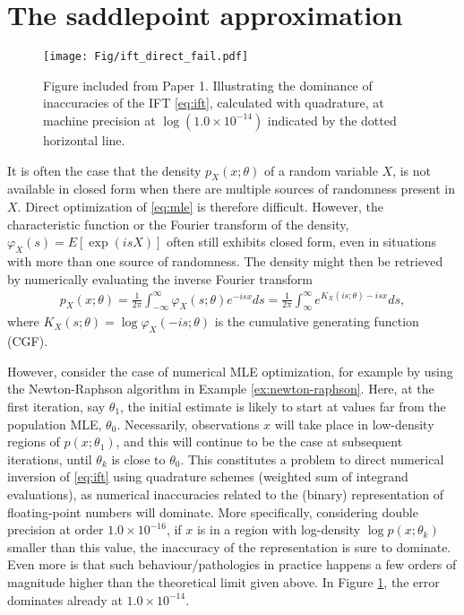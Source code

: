 

\section{The saddlepoint approximation}
\begin{figure}[t!]
	\centering
	\texttt{[image: Fig/ift\_direct\_fail.pdf]}
	\caption{
	\label{fig:ift-direct-fail}
	Figure included from Paper 1. Illustrating the dominance of inaccuracies of the IFT \eqref{eq:ift}, calculated with quadrature, at machine precision at $\log(1.0\times 10^{-14})$ indicated by the dotted horizontal line.
	}
\end{figure}
It is often the case that the density $p_X(x;\theta)$ of a random variable $X$, is not available in closed form when there are multiple sources of randomness present in $X$.
Direct optimization of \eqref{eq:mle} is therefore difficult.
However, the characteristic function or the Fourier transform of the density, $\varphi_X(s)=E[\exp(isX)]$ often still exhibits closed form, even in situations with more than one source of randomness.
The density might then be retrieved by numerically evaluating the inverse Fourier transform
\begin{align}\label{eq:ift}
	p_X(x;\theta) = \frac{1}{2\pi} \int_{-\infty}^{\infty} \varphi_X(s;\theta)e^{-isx} ds
	= \frac{1}{2\pi} \int_{\infty}^{\infty} e^{K_X(is;\theta)-isx} ds,
\end{align}
where $K_X(s;\theta)=\log\varphi_X(-is;\theta)$ is the cumulative generating function (CGF).

However, consider the case of numerical MLE optimization, for example by using the Newton-Raphson algorithm in Example \ref{ex:newton-raphson}. 
Here, at the first iteration, say $\theta_1$, the initial estimate is likely to start at values far from the population MLE, $\theta_0$.
Necessarily, observations $x$ will take place in low-density regions of $p(x;\theta_1)$, and this will continue to be the case at subsequent iterations, until $\theta_k$ is close to $\theta_0$.
This constitutes a problem to direct numerical inversion of \eqref{eq:ift} using quadrature schemes (weighted sum of integrand evaluations), as numerical inaccuracies related to the (binary) representation of floating-point numbers will dominate.
More specifically, considering double precision at order $1.0\times 10^{-16}$, if $x$ is in a region with log-density $\log p(x;\theta_k)$ smaller than this value, the inaccuracy of the representation is sure to dominate. Even more is that such behaviour/pathologies in practice happens a few orders of magnitude higher than the theoretical limit given above. In Figure \ref{fig:ift-direct-fail}, the error dominates already at $1.0\times 10^{-14}$.

